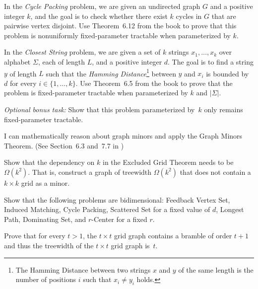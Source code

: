 \documentclass{uebung_cs}
\begin{document}
\begin{exercise}
  In the \emph{Cycle Packing} problem, we are given an undirected graph $G$ and a positive integer $k$, and the goal is to check whether there exist $k$ cycles in $G$ that are pairwise vertex disjoint. Use Theorem~6.12 from the book to prove that this problem is nonuniformly fixed-parameter tractable when parameterized by $k$.
\end{exercise}

\begin{exercise}
  In the \emph{Closest String} problem, we are given a set of $k$ strings $x_1,\dots,x_k$ over alphabet $\Sigma$, each of length $L$, and a positive integer $d$. The goal is to find a string $y$ of length $L$ such that the \emph{Hamming Distance}\footnote{The Hamming Distance between two strings $x$ and $y$ of the same length is the number of positions $i$ such that $x_i \neq y_i$ holds.} between $y$ and $x_i$ is bounded by $d$ for every $i\in \{1,\dots,k\}$. Use Theorem~6.5 from the book to prove that the problem is fixed-parameter tractable when parameterized by $k$ and $|\Sigma|$.

  \noindent\emph{Optional bonus task:} Show that this problem parameterized by~$k$ only remains fixed-parameter tractable.
\end{exercise}


\begin{skill}
  I can mathematically reason about graph minors and apply the Graph Minors Theorem. \normalfont (See Section~6.3 and~7.7 in \cygan{})
\end{skill}

\begin{exercise}
  Show that the dependency on $k$ in the Excluded Grid Theorem needs to be $\Omega(k^2)$. That is, construct a graph of treewidth $\Omega(k^2)$ that does not contain a $k \times k$ grid as a minor.
\end{exercise}

\begin{exercise}[Bidimensionality]
  Show that the following problems are bidimensional: Feedback Vertex Set, Induced Matching, Cycle Packing, Scattered Set for a fixed value of $d$, Longest Path, Dominating Set, and $r$-Center for a fixed $r$.
\end{exercise}

\begin{exercise}
  Prove that for every $t > 1$, the $t\times t$ grid graph contains a bramble of order $t + 1$ and thus the treewidth of the $t\times t$ grid graph is~$t$.
\end{exercise}
\end{document}
